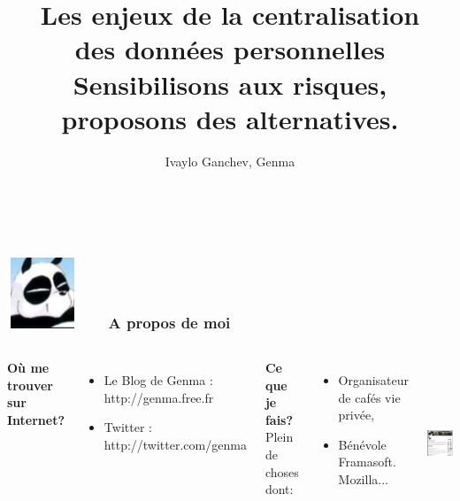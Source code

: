 \documentclass{beamer}
\title[]{Les enjeux de la centralisation \\ des données personnelles \\ Sensibilisons aux risques,  \\proposons des alternatives.}
\author{Ivaylo Ganchev, Genma}
\begin{document}
\begin{frame}
	\titlepage
	\vfill
	\begin{center}
		\\[2.5ex]
		{\tiny\CcNote{\CcLongnameByNcSa}}
		\vspace*{-2.5ex}
	\end{center}
\end{frame}


\begin{frame}
\frametitle{\includegraphics[scale=0.4]{./images/Genma.jpg} \ \ \  A propos de moi  }
\begin{columns}[c] 

\textbf{Où me trouver sur Internet?}
\begin{itemize}
\item Le Blog de Genma : http://genma.free.fr
\item Twitter : http://twitter.com/genma
\end{itemize}

\textbf{Ce que je fais?}
\\ Plein de choses dont:
\begin{itemize}
\item Organisateur de cafés vie privée,
\item Bénévole Framasoft. Mozilla...
\end{itemize}

\includegraphics[width=5cm,height=5cm]{./images/blog.png} 
\end{columns}
\end{frame}
\end{document}
